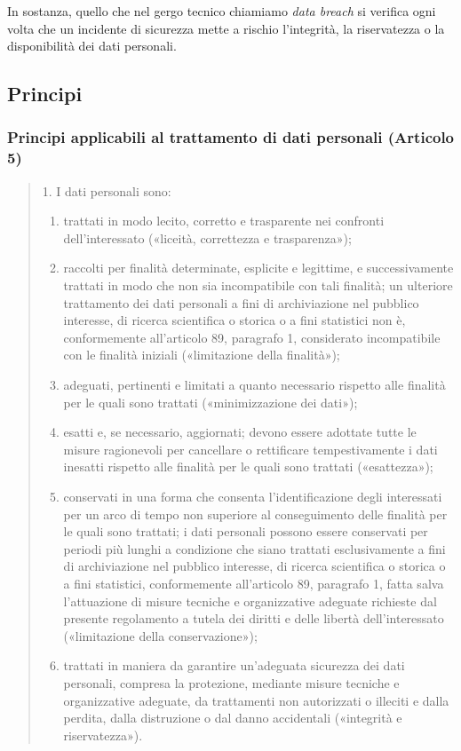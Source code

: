 In sostanza, quello che nel gergo tecnico chiamiamo \textit{data breach} si verifica ogni volta che un incidente di sicurezza mette a rischio l'integrità, la riservatezza o la disponibilità dei dati personali.
\subsection{Principi}
\subsubsection*{Principi applicabili al trattamento di dati personali (Articolo 5)}
\begin{quote}
    1. I dati personali sono:
    \begin{enumerate}[label=\alph*)]
        \item trattati in modo lecito, corretto e trasparente nei confronti dell'interessato («liceità, correttezza e trasparenza»);
        \item raccolti per finalità determinate, esplicite e legittime, e successivamente trattati in modo che non sia incompatibile con tali finalità; un ulteriore trattamento dei dati personali a fini di archiviazione nel pubblico interesse, di ricerca scientifica o storica o a fini statistici non è, conformemente all'articolo 89, paragrafo 1, considerato incompatibile con le finalità iniziali («limitazione della finalità»);
        \item adeguati, pertinenti e limitati a quanto necessario rispetto alle finalità per le quali sono trattati («minimizzazione dei dati»);
        \item esatti e, se necessario, aggiornati; devono essere adottate tutte le misure ragionevoli per cancellare o rettificare tempestivamente i dati inesatti rispetto alle finalità per le quali sono trattati («esattezza»);
        \item conservati in una forma che consenta l'identificazione degli interessati per un arco di tempo non superiore al conseguimento delle finalità per le quali sono trattati; i dati personali possono essere conservati per periodi più lunghi a condizione che siano trattati esclusivamente a fini di archiviazione nel pubblico interesse, di ricerca scientifica o storica o a fini statistici, conformemente all'articolo 89, paragrafo 1, fatta salva l'attuazione di misure tecniche e organizzative adeguate richieste dal presente regolamento a tutela dei diritti e delle libertà dell'interessato («limitazione della conservazione»);
        \item trattati in maniera da garantire un'adeguata sicurezza dei dati personali, compresa la protezione, mediante misure tecniche e organizzative adeguate, da trattamenti non autorizzati o illeciti e dalla perdita, dalla distruzione o dal danno accidentali («integrità e riservatezza»).
    \end{enumerate}
\end{quote}
